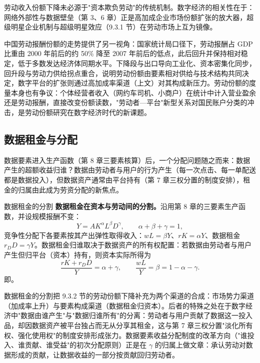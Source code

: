 劳动收入份额下降未必源于"资本欺负劳动"的传统机制。数字经济的相关性在于：网络外部性与数据壁垒（第 3、6 章）正是高加成企业市场份额扩张的放大器，超级明星企业机制与超级明星效应（9.3.1 节）在劳动市场上互为镜像。

中国劳动报酬份额的走势提供了另一视角：国家统计局口径下，劳动报酬占 GDP 比重由 2000 年前后的约 50\% 降至 2007 年前后的低点，此后回升并保持相对稳定，低于多数发达经济体同期水平。下降段与出口导向工业化、资本密集化同步，回升段与劳动力供给拐点重合，说明劳动份额由要素相对供给与技术结构共同决定，数字平台的扩张则通过高加成率渠道（上文）对其构成新压力。劳动份额的度量本身也有争议：个体经营者收入（网约车司机、小商户）在统计中计入营业盈余还是劳动报酬，直接改变份额读数，"劳动者—平台"新型关系对国民账户分类的冲击，是劳动份额研究在数字经济时代的新课题。

\subsection{数据租金与分配}

数据要素进入生产函数（第 8 章三要素核算）后，一个分配问题随之而来：数据产生的超额收益归谁？数据由劳动者与用户的行为产生（每一次点击、每一单配送都是数据投入），但数据资产通常由平台持有（第 7 章三权分置的制度安排），租金的归属由此成为劳资分配的新焦点。

\begin{derivation}{数据租金的分割}{}
\textbf{数据租金在资本与劳动间的分割。}沿用第 8 章的三要素生产函数，并设规模报酬不变：
\[
Y = A K^\alpha L^\beta D^\gamma, \qquad \alpha + \beta + \gamma = 1,
\]
竞争性分配下各要素按其产出弹性取得收入：$wL = \beta Y$、$rK = \alpha Y$、数据租金 $r_D D = \gamma Y$。数据租金归谁取决于数据资产的所有权配置：若数据由劳动者与用户产生但归平台（资本）持有，则资本实际所得为
\[
\frac{rK + r_D D}{Y} = \alpha + \gamma, \qquad \frac{wL}{Y} = \beta = 1 - \alpha - \gamma.
\]
即。
\end{derivation}

数据租金的分割把 9.3.2 节的劳动份额下降补充为两个渠道的合成：市场势力渠道（加成率上升）与要素构成渠道（数据租金归资本）。后者的特殊之处在于数字经济中"数据由谁产生"与"数据归谁所有"的分离：劳动者与用户贡献了数据这一投入品，却因数据资产被平台独占而无从分享其租金，这与第 7 章三权分置"淡化所有权、强化使用权"的制度安排形成张力。数据要素收益分配制度的改革方向（"谁投入、谁贡献、谁受益"的初次分配原则）正是在 $\gamma$ 的归属上做文章：承认劳动对数据形成的贡献，让数据收益的一部分按贡献回归劳动者。

